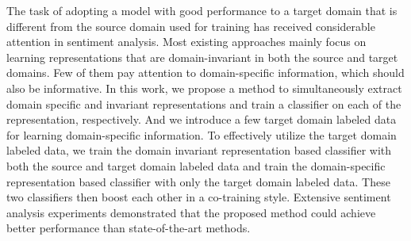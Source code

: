 The task of adopting a model with good performance to a target domain that is different from the source domain used for training has received considerable attention in sentiment analysis. Most existing approaches mainly focus on learning representations that are domain-invariant in both the source and target domains. Few of them pay attention to domain-specific information, which should also be informative. In this work, we propose a method to simultaneously extract domain specific and invariant representations and train a classifier on each of the representation, respectively. And we introduce a few target domain labeled data for learning domain-specific information. To effectively utilize the target domain labeled data, we train the domain invariant representation based classifier with both the source and target domain labeled data and train the domain-specific representation based classifier with only the target domain labeled data. These two classifiers then boost each other in a co-training style. Extensive sentiment analysis experiments demonstrated that the proposed method could achieve better performance than state-of-the-art methods.
